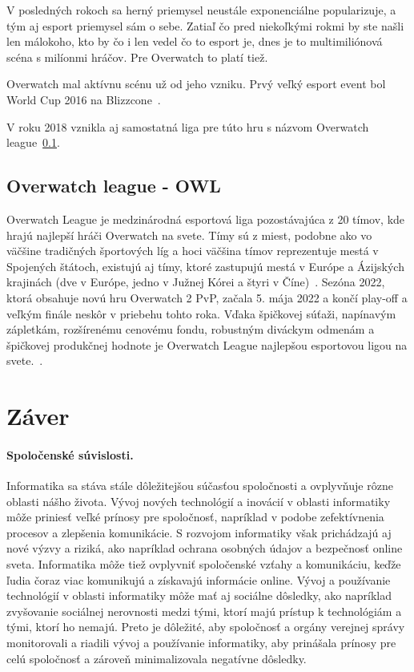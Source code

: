 \documentclass[10pt,oneside,slovak,a4paper]{article}
\begin{document}
V posledných rokoch sa herný priemysel neustále exponenciálne popularizuje, a tým aj esport priemysel sám o sebe. Zatiaľ čo pred niekoľkými rokmi by ste 
našli len málokoho, kto by čo i len vedel čo to esport je, dnes je to multimiliónová scéna s milíonmi hráčov. Pre Overwatch to platí tiež.

Overwatch mal aktívnu scénu už od jeho vzniku. Prvý veľký esport event bol World Cup 2016 na Blizzcone~\cite{Overwatchesport}.

V roku 2018 vznikla aj samostatná liga pre túto hru s názvom Overwatch league~\ref{Overwatch league - OWL}.

\subsection{Overwatch league - OWL} \label{Overwatch league - OWL}

Overwatch League je medzinárodná esportová liga pozostávajúca z 20 tímov, kde hrajú najlepší hráči Overwatch na svete. Tímy sú z miest, podobne ako vo väčšine tradičných športových líg a hoci väčšina tímov reprezentuje mestá v Spojených štátoch, existujú aj tímy, ktoré zastupujú mestá v Európe a Ázijských krajinách (dve v Európe, jedno v Južnej Kórei a štyri v Číne)~\cite{Overwatchesport}. Sezóna 2022, ktorá obsahuje novú hru Overwatch 2 PvP, začala 5. mája 2022 a končí play-off a veľkým finále neskôr v priebehu tohto roka. Vďaka špičkovej súťaži, napínavým zápletkám, rozšírenému cenovému fondu, robustným diváckym odmenám a špičkovej produkčnej hodnote je Overwatch League najlepšou esportovou ligou na svete.~\cite{Overwatchsite}.



\section{Záver} \label{zaver} %



\paragraph{Spoločenské súvislosti.}

Informatika sa stáva stále dôležitejšou súčasťou spoločnosti a ovplyvňuje rôzne oblasti nášho života.
Vývoj nových technológií a inovácií v oblasti informatiky môže priniesť veľké prínosy pre spoločnosť, napríklad v podobe zefektívnenia procesov a zlepšenia komunikácie. S rozvojom informatiky však prichádzajú aj nové výzvy a riziká, ako napríklad ochrana osobných údajov a bezpečnosť online sveta.
Informatika môže tiež ovplyvniť spoločenské vzťahy a komunikáciu, keďže ľudia čoraz viac komunikujú a získavajú informácie online.
Vývoj a používanie technológií v oblasti informatiky môže mať aj sociálne dôsledky, ako napríklad zvyšovanie sociálnej nerovnosti medzi tými, ktorí majú prístup k technológiám a tými, ktorí ho nemajú. Preto je dôležité, aby spoločnosť a orgány verejnej správy monitorovali a riadili vývoj a používanie informatiky, aby prinášala prínosy pre celú spoločnosť a zároveň minimalizovala negatívne dôsledky.
\end{document}

